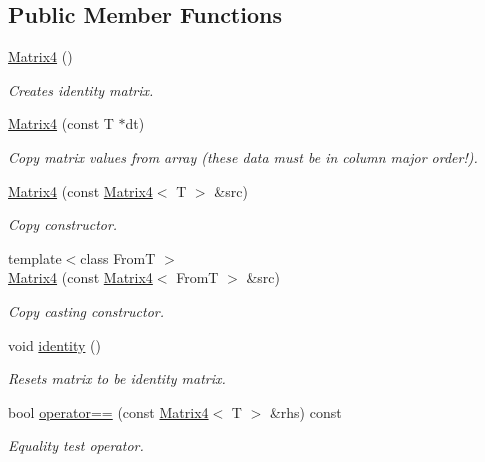 \subsection*{Public Member Functions}
\begin{DoxyCompactItemize}
\item 
\hyperlink{class_matrix4_ab24760b5fdf4cac34df976d6820394c2}{Matrix4} ()
\begin{DoxyCompactList}\small\item\em Creates identity matrix. \item\end{DoxyCompactList}\item 
\hyperlink{class_matrix4_a49ad707e9df6e90d71b4e1ee631340fd}{Matrix4} (const T $\ast$dt)
\begin{DoxyCompactList}\small\item\em Copy matrix values from array (these data must be in column major order!). \item\end{DoxyCompactList}\item 
\hyperlink{class_matrix4_a222824e031d77fea24ef41d30a4b0e4a}{Matrix4} (const \hyperlink{class_matrix4}{Matrix4}$<$ T $>$ \&src)
\begin{DoxyCompactList}\small\item\em Copy constructor. \item\end{DoxyCompactList}\item 
{\footnotesize template$<$class FromT $>$ }\\\hyperlink{class_matrix4_a55afc9a90ad770fba8043b20f5c744d5}{Matrix4} (const \hyperlink{class_matrix4}{Matrix4}$<$ FromT $>$ \&src)
\begin{DoxyCompactList}\small\item\em Copy casting constructor. \item\end{DoxyCompactList}\item 
void \hyperlink{class_matrix4_a0477c32b08c8d45ca1cc1b99026c34e9}{identity} ()
\begin{DoxyCompactList}\small\item\em Resets matrix to be identity matrix. \item\end{DoxyCompactList}\item 
bool \hyperlink{class_matrix4_a35c2d2ba0451091b51d4e2b10bee24ae}{operator==} (const \hyperlink{class_matrix4}{Matrix4}$<$ T $>$ \&rhs) const 
\begin{DoxyCompactList}\small\item\em Equality test operator. \item\end{DoxyCompactList}\item 

\end{DoxyCompactItemize}
